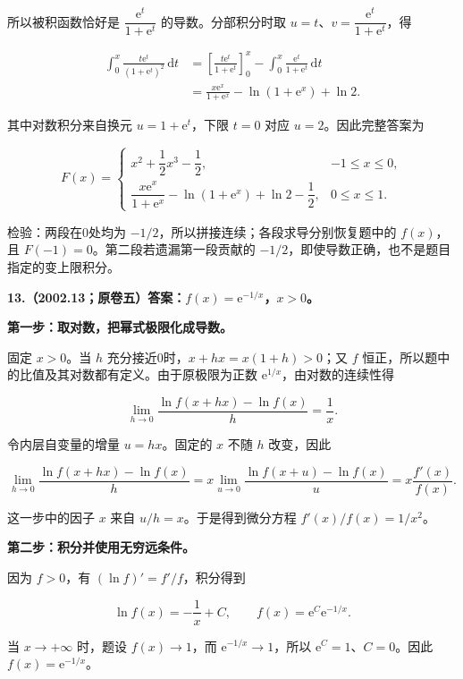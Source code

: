 \documentclass[UTF8,11pt,fontset=windows]{ctexart}
\begin{document}
所以被积函数恰好是 $\dfrac{\mathrm e^t}{1+\mathrm e^t}$ 的导数。分部积分时取 $u=t$、$v=\dfrac{\mathrm e^t}{1+\mathrm e^t}$，得

$$
\begin{aligned}
\int_0^x\frac{t\mathrm e^t}{(1+\mathrm e^t)^2}\,\mathrm dt
&=\left[\frac{t\mathrm e^t}{1+\mathrm e^t}\right]_0^x
-\int_0^x\frac{\mathrm e^t}{1+\mathrm e^t}\,\mathrm dt\\
&=\frac{x\mathrm e^x}{1+\mathrm e^x}-\ln(1+\mathrm e^x)+\ln2.
\end{aligned}
$$

其中对数积分来自换元 $u=1+\mathrm e^t$，下限 $t=0$ 对应 $u=2$。因此完整答案为

$$
\boxed{F(x)=\begin{cases}
x^2+\dfrac12x^3-\dfrac12,&-1\le x\le0,\\[6pt]
\dfrac{x\mathrm e^x}{1+\mathrm e^x}-\ln(1+\mathrm e^x)+\ln2-\dfrac12,&0\le x\le1.
\end{cases}}
$$

检验：两段在0处均为 $-1/2$，所以拼接连续；各段求导分别恢复题中的 $f(x)$，且 $F(-1)=0$。第二段若遗漏第一段贡献的 $-1/2$，即使导数正确，也不是题目指定的变上限积分。

\clearpage

\textbf{13.（2002.13；原卷五）答案：$f(x)=\mathrm e^{-1/x}$，$x>0$。}

\textbf{第一步：取对数，把幂式极限化成导数。}

固定 $x>0$。当 $h$ 充分接近0时，$x+hx=x(1+h)>0$；又 $f$ 恒正，所以题中的比值及其对数都有定义。由于原极限为正数 $\mathrm e^{1/x}$，由对数的连续性得

$$
\lim_{h\to0}\frac{\ln f(x+hx)-\ln f(x)}h=\frac1x.
$$

令内层自变量的增量 $u=hx$。固定的 $x$ 不随 $h$ 改变，因此

$$
\lim_{h\to0}\frac{\ln f(x+hx)-\ln f(x)}h
=x\lim_{u\to0}\frac{\ln f(x+u)-\ln f(x)}u
=x\frac{f'(x)}{f(x)}.
$$

这一步中的因子 $x$ 来自 $u/h=x$。于是得到微分方程 $f'(x)/f(x)=1/x^2$。

\textbf{第二步：积分并使用无穷远条件。}

因为 $f>0$，有 $(\ln f)'=f'/f$，积分得到

$$
\ln f(x)=-\frac1x+C,
\qquad f(x)=\mathrm e^C\mathrm e^{-1/x}.
$$

当 $x\to+\infty$ 时，题设 $f(x)\to1$，而 $\mathrm e^{-1/x}\to1$，所以 $\mathrm e^C=1$、$C=0$。因此 $\boxed{f(x)=\mathrm e^{-1/x}}$。
\end{document}
